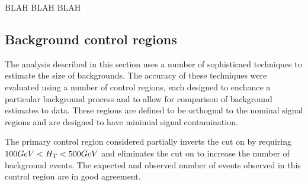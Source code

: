 

BLAH BLAH BLAH

\subsection{Background control regions}

The analysis described in this section uses a number of sophisticaed techniques to estimate the size of backgrounds.
The accuracy of these techniques were evaluated using a number of control regions, each designed to enchance a particular background process and to allow for comparison of background estimates to data.
These regions are defined to be orthognal to the nominal signal regions and are designed to have minimial signal contamination.


The primary control region considered partially inverts the cut on \HT{} by requiring $100 GeV < H_{\mathrm{T}}{} < 500 GeV$ and eliminates the cut on \met{} to increase the number of background events.
The expected and observed number of events observed in this control region are in good agreement.

